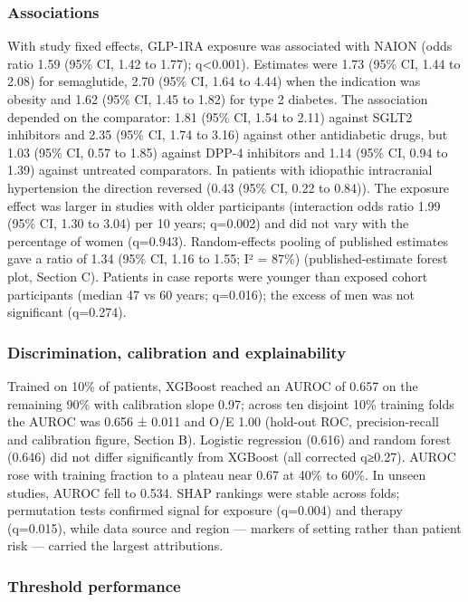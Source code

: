 \documentclass[
  11pt,
]{article}
\begin{document}
\subsubsection{Associations}\label{associations}

With study fixed effects, GLP-1RA exposure was associated with NAION
(odds ratio 1.59 (95\% CI, 1.42 to 1.77); q\textless0.001). Estimates
were 1.73 (95\% CI, 1.44 to 2.08) for semaglutide, 2.70 (95\% CI, 1.64
to 4.44) when the indication was obesity and 1.62 (95\% CI, 1.45 to
1.82) for type 2 diabetes. The association depended on the comparator:
1.81 (95\% CI, 1.54 to 2.11) against SGLT2 inhibitors and 2.35 (95\% CI,
1.74 to 3.16) against other antidiabetic drugs, but 1.03 (95\% CI, 0.57
to 1.85) against DPP-4 inhibitors and 1.14 (95\% CI, 0.94 to 1.39)
against untreated comparators. In patients with idiopathic intracranial
hypertension the direction reversed (0.43 (95\% CI, 0.22 to 0.84)). The
exposure effect was larger in studies with older participants
(interaction odds ratio 1.99 (95\% CI, 1.30 to 3.04) per 10 years;
q=0.002) and did not vary with the percentage of women (q=0.943).
Random-effects pooling of published estimates gave a ratio of 1.34 (95\%
CI, 1.16 to 1.55; I² = 87\%) (published-estimate forest plot, Section
C). Patients in case reports were younger than exposed cohort
participants (median 47 vs 60 years; q=0.016); the excess of men was not
significant (q=0.274).

\subsubsection{Discrimination, calibration and
explainability}\label{discrimination-calibration-and-explainability}

Trained on 10\% of patients, XGBoost reached an AUROC of 0.657 on the
remaining 90\% with calibration slope 0.97; across ten disjoint 10\%
training folds the AUROC was 0.656 ± 0.011 and O/E 1.00 (hold-out ROC,
precision-recall and calibration figure, Section B). Logistic regression
(0.616) and random forest (0.646) did not differ significantly from
XGBoost (all corrected q≥0.27). AUROC rose with training fraction to a
plateau near 0.67 at 40\% to 60\%. In unseen studies, AUROC fell to
0.534. SHAP rankings were stable across folds; permutation tests
confirmed signal for exposure (q=0.004) and therapy (q=0.015), while
data source and region --- markers of setting rather than patient risk
--- carried the largest attributions.

\subsubsection{Threshold performance}\label{threshold-performance}
\end{document}

